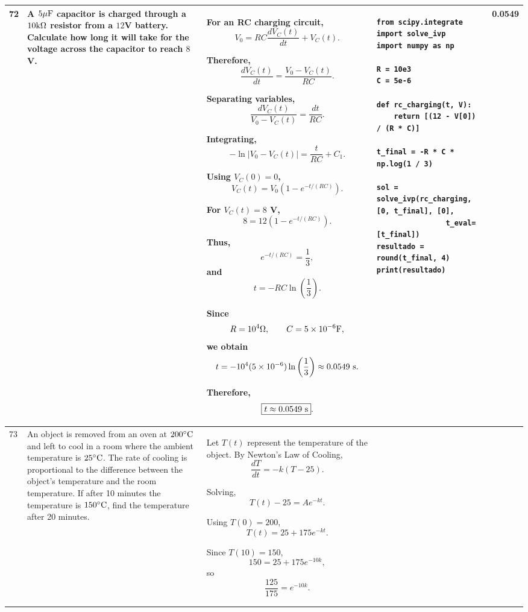 \documentclass[a4paper,12pt]{article}
\begin{document}
\begin{longtable}{|p{0.3cm}|p{}|p{10cm}|p{}|p{1.5cm}|}
72 &
A $5\mu{\rm F}$ capacitor is charged through a $10{\rm k}\Omega$ resistor from a $12$V battery. Calculate how long it will take for the voltage across the capacitor to reach $8$V. &
For an RC charging circuit,
\[
V_0=RC\frac{dV_C(t)}{dt}+V_C(t).
\]

Therefore,
\[
\frac{dV_C(t)}{dt}
=\frac{V_0-V_C(t)}{RC}.
\]

Separating variables,
\[
\frac{dV_C(t)}{V_0-V_C(t)}
=\frac{dt}{RC}.
\]

Integrating,
\[
-\ln|V_0-V_C(t)|
=\frac{t}{RC}+C_1.
\]

Using $V_C(0)=0$,
\[
V_C(t)=V_0\left(1-e^{-t/(RC)}\right).
\]

For $V_C(t)=8$ V,
\[
8=12\left(1-e^{-t/(RC)}\right).
\]

Thus,
\[
e^{-t/(RC)}=\frac{1}{3},
\]
and
\[
t=-RC\ln\left(\frac{1}{3}\right).
\]

Since
\[
R=10^4\Omega,
\qquad
C=5\times10^{-6}{\rm F},
\]
we obtain
\[
t=-10^4(5\times10^{-6})
\ln\left(\frac{1}{3}\right)
\approx0.0549\ {\rm s}.
\]

Therefore,
\[
\boxed{t\approx0.0549\ {\rm s}}.
\]
&
\begin{verbatim}
from scipy.integrate import solve_ivp
import numpy as np

R = 10e3
C = 5e-6

def rc_charging(t, V):
    return [(12 - V[0]) / (R * C)]

t_final = -R * C * np.log(1 / 3)

sol = solve_ivp(rc_charging, [0, t_final], [0],
                t_eval=[t_final])
resultado = round(t_final, 4)
print(resultado)
\end{verbatim}
&
0.0549 \\
\hline

73 &
An object is removed from an oven at $200^\circ{\rm C}$ and left to cool in a room where the ambient temperature is $25^\circ{\rm C}$. The rate of cooling is proportional to the difference between the object's temperature and the room temperature. If after 10 minutes the temperature is $150^\circ{\rm C}$, find the temperature after 20 minutes. &
Let $T(t)$ represent the temperature of the object. By Newton's Law of Cooling,
\[
\frac{dT}{dt}=-k(T-25).
\]

Solving,
\[
T(t)-25=Ae^{-kt}.
\]

Using $T(0)=200$,
\[
T(t)=25+175e^{-kt}.
\]

Since $T(10)=150$,
\[
150=25+175e^{-10k},
\]
so
\[
\frac{125}{175}=e^{-10k}.
\]


\end{longtable}
\end{document}
